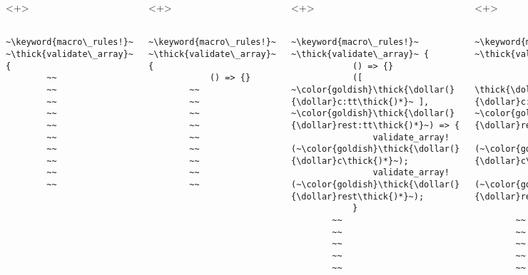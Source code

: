\documentclass[usepdftitle=false]{beamer}
\newcommand{\dollar}{\makebox[\widthof{\$}][c]{\$}}
\newcommand{\thick}[1]{\contourlength{0.16pt}\contour[10]{black}{#1}}
\newcommand{\hi}[1]{%
\tikz[baseline=(A.base)]
 \node[highlighting=yellowbg,inner sep=0pt,text depth=0pt] (A) {#1};%
}
\newcommand{\keyword}[1]{\color{greenish}#1}
\begin{document}
\begin{frame}[fragile]
  \begin{columns}
    \column{\dimexpr\paperwidth-40pt}
    \begin{onlyenv}<+>
      \begin{verbatim}
        ~\keyword{macro\_rules!}~ ~\thick{validate\_array}~ {
        ~~
        ~~
        ~~
        ~~
        ~~
        ~~
        ~~
        ~~
        ~~
        ~~
      \end{verbatim}
    \end{onlyenv}
    \begin{onlyenv}<+>
      \begin{verbatim}
        ~\keyword{macro\_rules!}~ ~\thick{validate\_array}~ {
            () => {}
        ~~
        ~~
        ~~
        ~~
        ~~
        ~~
        ~~
        ~~
        ~~
      \end{verbatim}
    \end{onlyenv}
    \begin{onlyenv}<+>
      \begin{verbatim}
        ~\keyword{macro\_rules!}~ ~\thick{validate\_array}~ {
            () => {}
            ([ ~\color{goldish}\thick{\dollar(}{\dollar}c:tt\thick{)*}~ ], ~\color{goldish}\thick{\dollar(}{\dollar}rest:tt\thick{)*}~) => {
                validate_array!(~\color{goldish}\thick{\dollar(}{\dollar}c\thick{)*}~);
                validate_array!(~\color{goldish}\thick{\dollar(}{\dollar}rest\thick{)*}~);
            }
        ~~
        ~~
        ~~
        ~~
        ~~
      \end{verbatim}
    \end{onlyenv}
    \begin{onlyenv}<+>
      \begin{verbatim}
        ~\keyword{macro\_rules!}~ ~\thick{validate\_array}~ {
            () => {}
            (~\hi{[ \thick{\dollar(}{\dollar}c:tt\thick{)*} ]}~, ~\color{goldish}\thick{\dollar(}{\dollar}rest:tt\thick{)*}~) => {
                validate_array!(~\color{goldish}\thick{\dollar(}{\dollar}c\thick{)*}~);
                validate_array!(~\color{goldish}\thick{\dollar(}{\dollar}rest\thick{)*}~);
            }
        ~~
        ~~
        ~~
        ~~
        ~~
      \end{verbatim}
    \end{onlyenv}
    \begin{onlyenv}<+>
      \begin{verbatim}
        ~\keyword{macro\_rules!}~ ~\thick{validate\_array}~ {

\end{verbatim}
\end{onlyenv}
\end{columns}
\end{frame}
\end{document}
